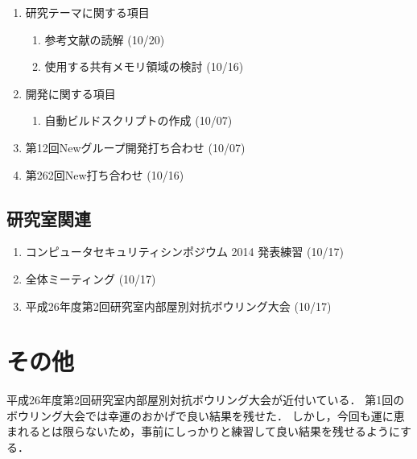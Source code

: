 \documentclass[fleqn, 14pt]{extarticle}
\begin{document}
\begin{enumerate}
\item 研究テーマに関する項目
\hfill
\begin{enumerate}


\item 参考文献の読解
\hfill
(10/20)

\item 使用する共有メモリ領域の検討
\hfill
(10/16)




\end{enumerate}
\item 開発に関する項目
\hfill
\begin{enumerate}

\item 自動ビルドスクリプトの作成
\hfill
(10/07)

\end{enumerate}
\item 第12回Newグループ開発打ち合わせ
\hfill
\label{enum-7}
(10/07)
\item 第262回New打ち合わせ
\hfill
\label{enum-3}
(10/16)
\end{enumerate}

\subsection{研究室関連}
\label{sec-4-2}

\begin{enumerate}



\item コンピュータセキュリティシンポジウム 2014 発表練習
\hfill
\label{enum-8}
(10/17)

\item 全体ミーティング
\hfill
\label{enum-9}
(10/17)
\item 平成26年度第2回研究室内部屋別対抗ボウリング大会
\hfill
\label{enum-10}
(10/17)
\end{enumerate}


\section{その他}
平成26年度第2回研究室内部屋別対抗ボウリング大会が近付いている．
第1回のボウリング大会では幸運のおかげで良い結果を残せた．
しかし，今回も運に恵まれるとは限らないため，事前にしっかりと練習して良い結果を残せるようにする．
\end{document}
